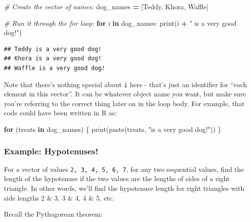 \documentclass[
]{book}
\newenvironment{Shaded}{\begin{snugshade}}{\end{snugshade}}
\newcommand{\BuiltInTok}[1]{#1}
\newcommand{\CommentTok}[1]{\textcolor[rgb]{0.56,0.35,0.01}{\textit{#1}}}
\newcommand{\ControlFlowTok}[1]{\textcolor[rgb]{0.13,0.29,0.53}{\textbf{#1}}}
\newcommand{\FunctionTok}[1]{\textcolor[rgb]{0.00,0.00,0.00}{#1}}
\newcommand{\KeywordTok}[1]{\textcolor[rgb]{0.13,0.29,0.53}{\textbf{#1}}}
\newcommand{\NormalTok}[1]{#1}
\newcommand{\OperatorTok}[1]{\textcolor[rgb]{0.81,0.36,0.00}{\textbf{#1}}}
\newcommand{\StringTok}[1]{\textcolor[rgb]{0.31,0.60,0.02}{#1}}
\begin{document}
\begin{Shaded}
\begin{Highlighting}[]
\CommentTok{\# Create the vector of names:}
\NormalTok{dog\_names }\OperatorTok{=}\NormalTok{ [}\StringTok{\textquotesingle{}Teddy\textquotesingle{}}\NormalTok{, }\StringTok{\textquotesingle{}Khora\textquotesingle{}}\NormalTok{, }\StringTok{\textquotesingle{}Waffle\textquotesingle{}}\NormalTok{]}

\CommentTok{\# Run it through the for loop:}
\ControlFlowTok{for}\NormalTok{ i }\KeywordTok{in}\NormalTok{ dog\_names:}
    \BuiltInTok{print}\NormalTok{(i }\OperatorTok{+} \StringTok{" is a very good dog!"}\NormalTok{)}
\end{Highlighting}
\end{Shaded}

\begin{verbatim}
## Teddy is a very good dog!
## Khora is a very good dog!
## Waffle is a very good dog!
\end{verbatim}

Note that there's nothing special about \texttt{i} here - that's just an identifier for ``each element in this vector''. It can be whatever object name you want, but make sure you're referring to the correct thing later on in the loop body. For example, that code could have been written in R as:

\begin{Shaded}
\begin{Highlighting}[]
\ControlFlowTok{for}\NormalTok{ (treats }\ControlFlowTok{in}\NormalTok{ dog\_names) \{}
  \FunctionTok{print}\NormalTok{(}\FunctionTok{paste}\NormalTok{(treats, }\StringTok{"is a very good dog!"}\NormalTok{))}
\NormalTok{\}}
\end{Highlighting}
\end{Shaded}

\hypertarget{example-hypotenuses}{%
\subsubsection{Example: Hypotenuses!}\label{example-hypotenuses}}

For a vector of values \texttt{2,\ 3,\ 4,\ 5,\ 6,\ 7}, for any two sequential values, find the length of the hypotenuse if the two values are the lengths of sides of a right triangle. In other words, we'll find the hypotenuse length for right triangles with side lengths 2 \& 3, 3 \& 4, 4 \& 5, etc.

Recall the Pythagorean theorem:
\end{document}
